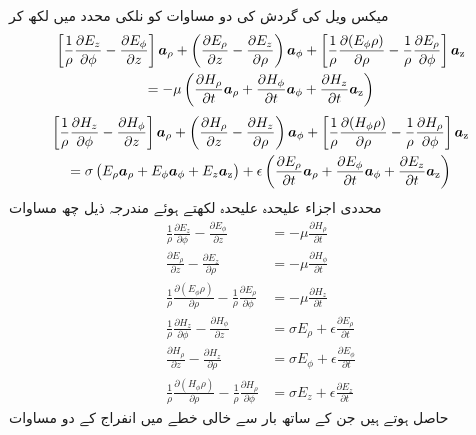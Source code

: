 میکس ویل کی  گردش کی دو مساوات  کو نلکی محدد میں لکھ کر
\begin{multline*}
\left[\frac{1}{\rho}\frac{\partial E_z}{\partial \phi} -\frac{\partial E_{\phi}}{\partial z}\right]{\boldsymbol{a}}_{\rho}+\left(\frac{\partial E_\rho}{\partial z}-\frac{\partial E_z}{\partial \rho} \right){\boldsymbol{a}}_{\phi}+\left[\frac{1}{\rho}\frac{\partial (E_{\phi}\rho )}{\partial \rho}-\frac{1}{\rho}\frac{\partial E_{\rho}}{\partial \phi}\right]{\boldsymbol{a}}_{\textup{z}} \\
=-\mu \left(\frac{\partial H_{\rho}}{\partial t} {\boldsymbol{a}}_{\rho}+\frac{\partial H_{\phi}}{\partial t}{\boldsymbol{a}}_{\phi}+\frac{\partial H_{z}}{\partial t} {\boldsymbol{a}}_{\textup{z}} \right)
\end{multline*}
%
\begin{multline*}
\left[\frac{1}{\rho}\frac{\partial H_z}{\partial \phi} -\frac{\partial H_{\phi}}{\partial z}\right]{\boldsymbol{a}}_{\rho}+\left(\frac{\partial H_\rho}{\partial z}-\frac{\partial H_z}{\partial \rho} \right){\boldsymbol{a}}_{\phi}+\left[\frac{1}{\rho}\frac{\partial (H_{\phi}\rho )}{\partial \rho}-\frac{1}{\rho}\frac{\partial H_{\rho}}{\partial \phi}\right]{\boldsymbol{a}}_{\textup{z}} \\
=\sigma\left(E_{\rho}{\boldsymbol{a}}_{\rho}+E_{\phi}{\boldsymbol{a}}_{\phi}+E_z {\boldsymbol{a}}_{\textup{z}} \right)+\epsilon \left(\frac{\partial E_{\rho}}{\partial t}{\boldsymbol{a}}_{\rho}+\frac{\partial E_{\phi}}{\partial t} {\boldsymbol{a}}_{\phi}+\frac{\partial E_{z}}{\partial t} {\boldsymbol{a}}_{\textup{z}}\right)
\end{multline*} 
محددی اجزاء علیحدہ علیحدہ لکھتے ہوئے مندرجہ ذیل چھ مساوات
\begin{align}
\frac{1}{\rho}\frac{\partial E_z}{\partial \phi} -\frac{\partial E_{\phi}}{\partial z}&=-\mu \frac{\partial H_{\rho}}{\partial t} \label{مساوات_مویج_نلکی_الف}\\
\frac{\partial E_\rho}{\partial z}-\frac{\partial E_z}{\partial \rho}&=-\mu\frac{\partial H_{\phi}}{\partial t}\\
\frac{1}{\rho}\frac{\partial (E_{\phi}\rho )}{\partial \rho}-\frac{1}{\rho}\frac{\partial E_{\rho}}{\partial \phi} &=-\mu \frac{\partial H_{z}}{\partial t}\\
\frac{1}{\rho}\frac{\partial H_z}{\partial \phi} -\frac{\partial H_{\phi}}{\partial z}&=\sigma E_{\rho}+\epsilon \frac{\partial E_{\rho}}{\partial t}\\
\frac{\partial H_\rho}{\partial z}-\frac{\partial H_z}{\partial \rho}&=\sigma E_{\phi}+\epsilon \frac{\partial E_{\phi}}{\partial t} \\
\frac{1}{\rho}\frac{\partial (H_{\phi}\rho )}{\partial \rho}-\frac{1}{\rho}\frac{\partial H_{\rho}}{\partial \phi}&=\sigma E_z +\epsilon\frac{\partial E_{z}}{\partial t} 
\end{align}
حاصل ہوتے ہیں جن کے ساتھ بار سے خالی  خطے میں انفراج کے دو مساوات

